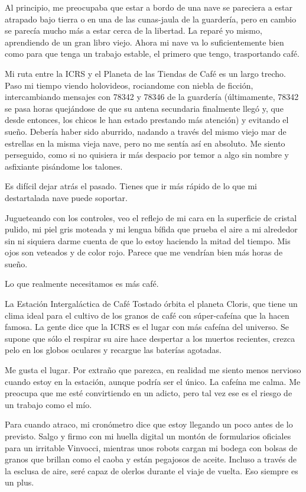 Al principio, me preocupaba que estar a bordo de una nave se pareciera a
estar atrapado bajo tierra o en una de las cunas-jaula de la guardería,
pero en cambio se parecía mucho más a estar cerca de la libertad. La
reparé yo mismo, aprendiendo de un gran libro viejo. Ahora mi nave va lo
suficientemente bien como para que tenga un trabajo estable, el primero
que tengo, trasportando café.

Mi ruta entre la ICRS y el Planeta de las Tiendas de Café es un largo
trecho. Paso mi tiempo viendo holovideos, rociandome con niebla de
ficción, intercambiando mensajes con 78342 y 78346 de la guardería
(últimamente, 78342 se pasa horas quejándose de que su antena secundaria
finalmente llegó y, que desde entonces, los chicos le han estado
prestando más atención) y evitando el sueño. Debería haber sido
aburrido, nadando a través del mismo viejo mar de estrellas en la misma
vieja nave, pero no me sentía así en absoluto. Me siento perseguido,
como si no quisiera ir más despacio por temor a algo sin nombre y
asfixiante pisándome los talones.

Es difícil dejar atrás el pasado. Tienes que ir más rápido de lo que mi
destartalada nave puede soportar.

Jugueteando con los controles, veo el reflejo de mi cara en la
superficie de cristal pulido, mi piel gris moteada y mi lengua bífida
que prueba el aire a mi alrededor sin ni siquiera darme cuenta de que lo
estoy haciendo la mitad del tiempo. Mis ojos son veteados y de color
rojo. Parece que me vendrían bien más horas de sueño.

Lo que realmente necesitamos es más café.

La Estación Intergaláctica de Café Tostado órbita el planeta Cloris, que
tiene un clima ideal para el cultivo de los granos de café con
súper-cafeína que la hacen famosa. La gente dice que la ICRS es el lugar
con más cafeína del universo. Se supone que sólo el respirar su aire
hace despertar a los muertos recientes, crezca pelo en los globos
oculares y recargue las baterías agotadas.

Me gusta el lugar. Por extraño que parezca, en realidad me siento menos
nervioso cuando estoy en la estación, aunque podría ser el único. La
cafeína me calma. Me preocupa que me esté convirtiendo en un adicto,
pero tal vez ese es el riesgo de un trabajo como el mío.

Para cuando atraco, mi cronómetro dice que estoy llegando un poco antes
de lo previsto. Salgo y firmo con mi huella digital un montón de
formularios oficiales para un irritable Vinvocci, mientras unos robots
cargan mi bodega con bolsas de granos que brillan como el caoba y están
pegajosos de aceite. Incluso a través de la esclusa de aire, seré capaz
de olerlos durante el viaje de vuelta. Eso siempre es un plus.

